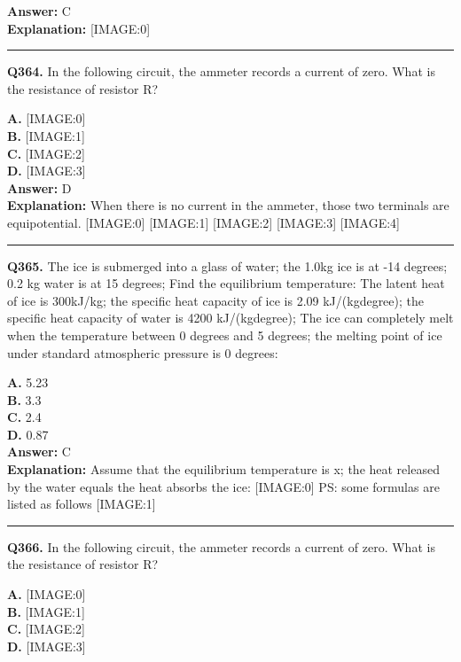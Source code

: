 \documentclass[12pt]{article}
\begin{document}
\textbf{Answer:} C \\
\textbf{Explanation:} [IMAGE:0]

\hrule
\vspace{1em}


\noindent
\textbf{Q364.} In the following circuit, the ammeter records a current of zero.
What is the resistance of resistor R?



\textbf{A.} [IMAGE:0] \\
\textbf{B.} [IMAGE:1] \\
\textbf{C.} [IMAGE:2] \\
\textbf{D.} [IMAGE:3] \\

\textbf{Answer:} D \\
\textbf{Explanation:} When there is no current in the ammeter, those two terminals are equipotential.
[IMAGE:0]
[IMAGE:1]
[IMAGE:2]
[IMAGE:3]
[IMAGE:4]

\hrule
\vspace{1em}


\noindent
\textbf{Q365.} The ice is submerged into a glass of water; the 1.0kg ice is at -14 degrees; 0.2 kg water is at 15 degrees; Find the equilibrium temperature: The latent heat of ice is 300kJ/kg; the specific heat capacity of ice is 2.09 kJ/(kg\cdot degree); the specific heat capacity of water is 4200 kJ/(kg\cdot degree); The ice can completely melt when the temperature between 0 degrees and 5 degrees; the melting point of ice under standard atmospheric pressure is 0 degrees:



\textbf{A.} 5.23 \\
\textbf{B.} 3.3 \\
\textbf{C.} 2.4 \\
\textbf{D.} 0.87 \\

\textbf{Answer:} C \\
\textbf{Explanation:} Assume that the equilibrium temperature is x; the heat released by the water equals the heat absorbs the ice:
[IMAGE:0]
PS: some formulas are listed as follows
[IMAGE:1]

\hrule
\vspace{1em}


\noindent
\textbf{Q366.} In the following circuit, the ammeter records a current of zero.
What is the resistance of resistor R?



\textbf{A.} [IMAGE:0] \\
\textbf{B.} [IMAGE:1] \\
\textbf{C.} [IMAGE:2] \\
\textbf{D.} [IMAGE:3] \\
\end{document}
